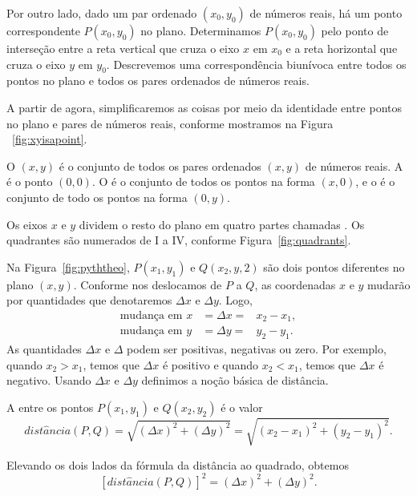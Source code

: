 \documentclass{svmono}
\begin{document}
Por outro lado, dado um par ordenado $(x_0,y_0)$ de números reais, há um
ponto correspondente $P(x_0,y_0)$ no plano. Determinamos $P(x_0,y_0)$ pelo
ponto de interseção entre a reta vertical que cruza o eixo $x$ em $x_0$
e a reta horizontal que cruza o eixo $y$ em $y_0$. Descrevemos uma
correspondência biunívoca entre todos os pontos no plano e todos os
pares ordenados de números reais.

A partir de agora, simplificaremos as coisas por meio da identidade entre
pontos no plano e pares de números reais, conforme mostramos na Figura%
~\ref{fig:xyisapoint}.


\begin{defin}
O  $(x,y)$ é o conjunto de todos os pares ordenados $(x,y)$
de números reais. A  é o ponto $(0,0)$. O 
é o conjunto de todos os pontos na forma $(x,0)$, e o  é
o conjunto de todo os pontos na forma $(0,y)$. 
\end{defin}

Os eixos $x$ e $y$ dividem o resto do plano em quatro partes chamadas
. Os quadrantes são numerados de I a IV, conforme
Figura~\ref{fig:quadrants}.

Na Figura~\ref{fig:pyththeo}, $P(x_1,y_1)$ e $Q(x_2,y,2)$ são dois
pontos diferentes no plano $(x,y)$. Conforme nos deslocamos de $P$
a $Q$, as coordenadas $x$ e $y$ mudarão por quantidades que
denotaremos $\Delta x$ e $\Delta y$. Logo,
\begin{eqnarray*}
\text{mudança em } x & = \Delta x = & x_2 - x_1, \\
\text{mudança em } y & = \Delta y = & y_2 - y_1.
\end{eqnarray*}
As quantidades $\Delta x$ e $\Delta$ podem ser positivas, negativas ou
zero. Por exemplo, quando $x_2 > x_1$, temos que $\Delta x$ é positivo
e quando $x_2 < x_1$, temos que $\Delta x$ é negativo. Usando $\Delta x$
e $\Delta y$ definimos a noção básica de distância.


\begin{defin}
A  entre os pontos $P(x_1,y_1)$ e $Q(x_2,y_2)$ é
o valor
\[
  dist\hat{a}ncia(P,Q) = \sqrt{(\Delta x)^2 + (\Delta y)^2}
                       = \sqrt{(x_2 - x_1)^2 + (y_2 - y_1)^2}.
\]
\end{defin}

Elevando os dois lados da fórmula da distância ao quadrado, obtemos
\[
  [dist\hat{a}ncia(P,Q)]^2 = (\Delta x)^2 + (\Delta y)^2.
\]
\end{document}
